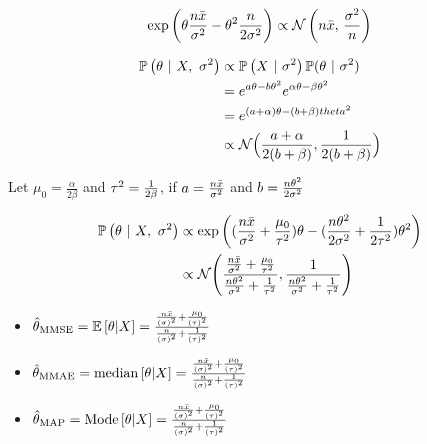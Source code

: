 \documentclass[12pt]{article}
\begin{document}
\begin{enumerate}


\begin{align*}
    \mathrm{exp}\left(\theta\frac{n\bar{x}}{\sigma^2}-\theta^2\frac{n}{2\sigma^2}\right)\propto\mathcal{N}\left(n\bar{x},\,\frac{\sigma^2}{n}\right)
\end{align*}


\begin{align*}
    \mathbb{P}\left(\theta~|~X,~\sigma^2\right) &\propto \mathbb{P}\left(X~|~\sigma^2\right)\mathbb{P}(\theta~|~\sigma^2)\\
&= e^{a\theta-b\theta^2}e^{\alpha\theta-\beta\theta^2}\\
&= e^{(a+\alpha)\theta-(b+\beta)theta^2}\\
&\propto \mathcal{N}\Big({\frac{a+\alpha}{2(b+\beta)}},\frac{1}{2(b+\beta)} \Big)
\end{align*}

 Let $\mu_0 = \frac{\alpha}{2\beta}$ and $\tau^2 = \frac{1}{2\beta}$,
if $a=\frac{n\bar{x}}{\sigma^2}$ and $b=\frac{n\theta^2}{2\sigma^2}$ 

\begin{align*}
    \mathbb{P}\left(\theta~|~X,~\sigma^2\right) 
    &\propto \mathrm{exp}\left((\frac{n\bar{x}}{\sigma^2}+\frac{\mu_0}{\tau^2})\theta
    -(\frac{n\theta^2}{2\sigma^2} + \frac{1}{2\tau^2})\theta^2\right) \\ 
    &\propto \mathcal{N}\Bigg({\frac{\frac{n\bar{x}}{\sigma^2}+\frac{\mu_0}{\tau^2}}{\frac{n\theta^2}{\sigma^2} + \frac{1}{\tau^2}}},
    \frac{1}{\frac{n\theta^2}{\sigma^2} + \frac{1}{\tau^2}} \Bigg)
\end{align*}


\begin{itemize}
    \item $\hat{\theta}_{\mathrm{MMSE}} = \mathbb{E}\left[\theta|X\right] = \frac{\frac{n\bar{x}}{\left(\sigma\right)^2} + \frac{\mu_0}{\left(\tau\right)^2}}{\frac{n}{\left(\sigma\right)^2} + \frac{1}{\left(\tau\right)^2}}$
    \item $\hat{\theta}_{\mathrm{MMAE}} = \text{median}\left[\theta|X\right] = \frac{\frac{n\bar{x}}{\left(\sigma\right)^2} + \frac{\mu_0}{\left(\tau\right)^2}}{\frac{n}{\left(\sigma\right)^2} + \frac{1}{\left(\tau\right)^2}}$
    \item $\hat{\theta}_{\mathrm{MAP}} = \text{Mode}\left[\theta|X\right] = \frac{\frac{n\bar{x}}{\left(\sigma\right)^2} + \frac{\mu_0}{\left(\tau\right)^2}}{\frac{n}{\left(\sigma\right)^2} + \frac{1}{\left(\tau\right)^2}}$
\end{itemize}


\end{enumerate}
\end{document}

